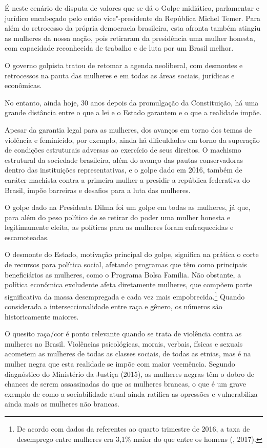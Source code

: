 É neste cenário de disputa de valores que se dá o Golpe midiático,
parlamentar e jurídico encabeçado pelo então vice"-presidente da
República Michel Temer. Para além do retrocesso da própria
democracia brasileira, esta afronta também atingiu as mulheres da nossa
nação, pois retiraram da presidência uma mulher honesta, com capacidade
reconhecida de trabalho e de luta por um Brasil melhor.

O governo golpista tratou de retomar a agenda neoliberal, com desmontes e
retrocessos na pauta das mulheres e em todas as áreas sociais, jurídicas
e econômicas.

No entanto, ainda hoje, 30 anos depois da promulgação da Constituição,
há uma grande distância entre o que a lei e o Estado garantem e o que a
realidade impõe.

Apesar da garantia legal para as mulheres, dos avanços em torno dos
temas de violência e feminicído, por exemplo, ainda há dificuldades em
torno da superação de condições estruturais adversas ao exercício de
seus direitos. O machismo estrutural da sociedade brasileira, além do
avanço das pautas conservadoras dentro das instituições representativas,
e o golpe dado em 2016, também de caráter machista contra a primeira
mulher a presidir a república federativa do Brasil, impõe barreiras e
desafios para a luta das mulheres.

O golpe dado na Presidenta Dilma foi um golpe em todas as mulheres, já
que, para além do peso político de se retirar do poder uma mulher
honesta e legitimamente eleita, as políticas para as mulheres foram
enfraquecidas e escamoteadas.

O desmonte do Estado, motivação principal do golpe, significa na prática
o corte de recursos para política social, afetando programas que têm
como principais beneficiários as mulheres, como o Programa Bolsa
Família. Não obstante, a política econômica excludente afeta diretamente
mulheres, que compõem parte significativa da massa desempregada e cada
vez mais empobrecida.\footnote{De acordo com dados da  referentes
  ao quarto trimestre de 2016, a taxa de desemprego entre mulheres era
  3,1\% maior do que entre os homens (, 2017).} Quando considerada
a interseccionalidade entre raça e gênero, os números são historicamente
maiores.

O quesito raça/cor é ponto relevante quando se trata de violência
contra as mulheres no Brasil. Violências psicológicas, morais, verbais,
físicas e sexuais acometem as mulheres de todas as classes sociais, de
todas as etnias, mas é na mulher negra que esta realidade se impõe com
maior veemência. Segundo diagnóstico do Ministério da Justiça (2015), as
mulheres negras têm o dobro de chances de serem assassinadas do que as
mulheres brancas, o que é um grave exemplo de como a sociabilidade atual
ainda ratifica as opressões e vulnerabiliza ainda mais as mulheres não
brancas.

